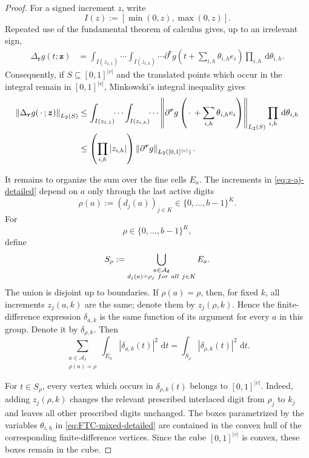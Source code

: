 \documentclass[11pt]{article}
\newcommand{\dd}{\,\mathrm d}
\begin{document}
\begin{proof}
For a signed increment $z$, write
\[
 I(z):=[\min(0,z),\max(0,z)].
\]
Repeated use of the fundamental theorem of calculus gives, up to an
irrelevant sign,
\begin{align}
 \Delta_{\boldsymbol r}g(t;\boldsymbol z)
 &=
 \int_{I(z_{1,1})}\!\!\cdots
 \int_{I(z_{i,h})}\!\!\cdots
 \partial^{\boldsymbol r}g
 \left(
   t+\sum_{i,h}\theta_{i,h}e_i
 \right)
 \prod_{i,h}\dd\theta_{i,h}.
 \label{eq:FTC-mixed-detailed}
\end{align}
Consequently, if $S\subseteq[0,1]^{|v|}$ and the translated points
which occur in the integral remain in $[0,1]^{|v|}$, Minkowski's
integral inequality gives
\begin{align}
 \left\|
 \Delta_{\boldsymbol r}g(\,\cdot\,;\boldsymbol z)
 \right\|_{L_2(S)}
 &\le
 \int_{I(z_{1,1})}\!\!\cdots
 \int_{I(z_{i,h})}\!\!\cdots
 \left\|
 \partial^{\boldsymbol r}g
 \left(
   \,\cdot\,
   +\sum_{i,h}\theta_{i,h}e_i
 \right)
 \right\|_{L_2(S)}
 \prod_{i,h}\dd\theta_{i,h}
 \notag\\
 &\le
 \left(\prod_{i,h}|z_{i,h}|\right)
 \left\|
   \partial^{\boldsymbol r}g
 \right\|_{L_2([0,1]^{|v|})}.
 \label{eq:finite-difference-L2-detailed}
\end{align}

It remains to organize the sum over the fine cells $E_a$.  The
increments in \eqref{eq:z-aj-detailed} depend on $a$ only through
the last active digits
\[
 \rho(a):=(d_j(a))_{j\in K}
 \in\{0,\ldots,b-1\}^{K}.
\]
For
\[
 \rho\in\{0,\ldots,b-1\}^{K},
\]
define
\[
 S_\rho
 :=
 \bigcup_{\substack{
 a\in\mathcal A_{\boldsymbol\ell}\\
 d_j(a)=\rho_j\ {\rm for\ all}\ j\in K}}
 E_a.
\]
The union is disjoint up to boundaries.  If $\rho(a)=\rho$, then,
for fixed $k$, all increments $z_j(a,k)$ are the same; denote them
by $z_j(\rho,k)$.  Hence the finite-difference expression
$\delta_{a,k}$ is the same function of its argument for every
$a$ in this group.  Denote it by $\delta_{\rho,k}$.  Then
\begin{equation}\label{eq:group-last-digits-detailed}
 \sum_{\substack{
 a\in\mathcal A_{\boldsymbol\ell}\\
 \rho(a)=\rho}}
 \int_{E_a}|\delta_{a,k}(t)|^2\,\dd t
 =
 \int_{S_\rho}|\delta_{\rho,k}(t)|^2\,\dd t.
\end{equation}

For $t\in S_\rho$, every vertex which occurs in
$\delta_{\rho,k}(t)$ belongs to $[0,1]^{|v|}$.  Indeed, adding
$z_j(\rho,k)$ changes the relevant prescribed interlaced digit
from $\rho_j$ to $k_j$ and leaves all other prescribed digits
unchanged.  The boxes parametrized by the variables
$\theta_{i,h}$ in \eqref{eq:FTC-mixed-detailed} are contained in
the convex hull of the corresponding finite-difference vertices.
Since the cube $[0,1]^{|v|}$ is convex, these boxes remain in the
cube.


\end{proof}
\end{document}
